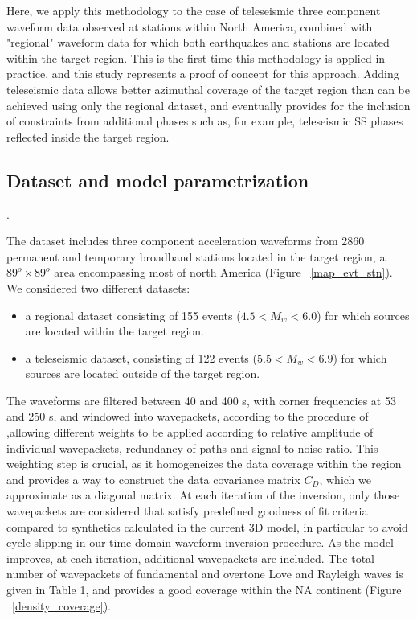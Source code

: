 \documentclass[12pt]{article}
\begin{document}
Here, we apply this methodology to the case of teleseismic three component waveform data observed at stations within North America, combined with "regional" waveform data for which both earthquakes and stations are located within the target region. 
This is the first time this methodology is applied in practice, and this study represents a proof of concept for this approach. 
Adding teleseismic data allows better azimuthal coverage of the target region than can be achieved using only the regional dataset, and eventually provides for the inclusion of constraints from additional phases such as, for example, teleseismic SS phases reflected inside the target region.



\subsection{Dataset and model parametrization}.

The dataset includes three component acceleration waveforms from 2860 permanent and temporary broadband stations located in the target region, a $89^o \times 89^o $ area encompassing most of north America (Figure ~\ref{map_evt_stn}). We considered two different datasets:
\begin{itemize}
	\item a regional dataset consisting of 155 events ($4.5 < M_w < 6.0$) for which sources are located within the target region.
	\item a teleseismic dataset, consisting of 122 events ($5.5 <M_w <6.9$) for which sources are located outside of the target region.
\end{itemize}

The waveforms are filtered between 40 and 400 s, with corner frequencies at 53 and 250 s, and windowed into wavepackets, according to the procedure of \cite{li1996global} ,allowing different weights to be applied according to relative amplitude of individual wavepackets, redundancy of paths and signal to noise ratio. 
This weighting step is crucial, as it homogeneizes the data coverage within the region and provides a way to construct the data covariance matrix $C_D$, which we approximate as a diagonal matrix. 
At each iteration of the inversion, only those wavepackets are considered that satisfy predefined goodness of fit criteria compared to synthetics calculated in the current 3D model, in particular to avoid cycle slipping in our time domain waveform inversion procedure. 
As the model improves, at each iteration, additional wavepackets are included. 
The total number of wavepackets of fundamental and overtone Love and Rayleigh waves is given in Table 1, and provides a good coverage within the NA continent (Figure ~\ref{density_coverage}).
\end{document}
